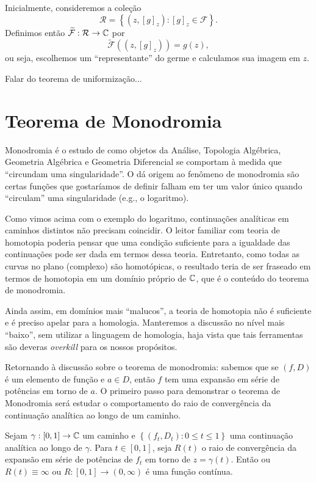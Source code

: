 Inicialmente, consideremos a coleção
%
\begin{equation*}
    \mathcal{R} = \left\{ (z, [g]_z) : [g]_z \in \mathcal{F} \right\}.
\end{equation*}
%
Definimos então $\widetilde{\mathcal{F}}:\mathcal{R}\to\mathbb{C}$ por
%
\begin{equation*}
    \widetilde{\mathcal{F}}((z, [g]_z)) = g(z),
\end{equation*}
%
ou seja, escolhemos um ``representante'' do germe e calculamos sua imagem em $z$.

{\red Falar do teorema de uniformização...}

\section{Teorema de Monodromia}

Monodromia é o estudo de como objetos da Análise, Topologia Algébrica, Geometria
Algébrica e Geometria Diferencial se comportam à medida que 
``circundam uma singularidade''. O dá origem ao fenômeno de monodromia são certas
funções que gostaríamos de definir falham em ter um valor único quando ``circulam''
uma singularidade (e.g., o logaritmo).

Como vimos acima com o exemplo do logaritmo, continuações analíticas em 
caminhos distintos não precisam coincidir. O leitor familiar com teoria de
homotopia poderia pensar que uma condição suficiente para a
igualdade das continuações pode ser dada em termos dessa teoria. Entretanto,
como todas as curvas no plano (complexo) são homotópicas, o resultado teria
de ser fraseado em termos de homotopia em um domínio próprio de $\mathbb{C}$,
que é o conteúdo do teorema de monodromia.

Ainda assim, em domínios mais ``malucos'', a teoria de homotopia não é suficiente
e é preciso apelar para a homologia. Manteremos a discussão no nível mais ``baixo'',
sem utilizar a linguagem de homologia, haja vista que tais
ferramentas são deveras \textit{overkill} para os nossos propósitos.

Retornando à discussão sobre o teorema de monodromia: sabemos que se $(f,D)$ é
um elemento de função e $a\in D$, então $f$ tem uma expansão em série de potências
em torno de $a$. O primeiro passo para demonstrar o teorema de Monodromia será
estudar o comportamento do raio de convergência da continuação analítica ao longo
de um caminho.

    \begin{lema}
    \label{lema-raio-convergencia-continuo}
        Sejam $\gamma: [0,1]\to\mathbb{C}$ um caminho e 
        $\left\{ (f_t, D_t): 0\leq t\leq 1 \right\}$ uma continuação analítica ao longo de
        $\gamma$. Para $t\in[0,1]$, seja $R(t)$ o raio de convergência da expansão em 
        série de potências de $f_t$ em torno de $z=\gamma(t)$. Então ou $R(t) \equiv\infty$
        ou $R: [0,1]\to (0, \infty)$ é uma função contínua.
    \end{lema}

